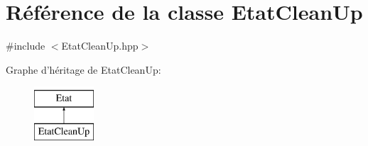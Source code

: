 \hypertarget{class_etat_clean_up}{\section{Référence de la classe Etat\-Clean\-Up}
\label{class_etat_clean_up}
}


{\ttfamily \#include $<$Etat\-Clean\-Up.\-hpp$>$}

Graphe d'héritage de Etat\-Clean\-Up\-:\begin{figure}[H]
\begin{center}
\leavevmode
\includegraphics[height=2.000000cm]{class_etat_clean_up}
\end{center}
\end{figure}
